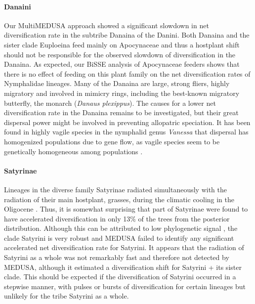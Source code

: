 \documentclass[10pt,letterpaper]{article}
\begin{document}
\paragraph*{Danaini}
Our MultiMEDUSA approach showed a significant slowdown in net
diversification rate in the subtribe Danaina of the Danini. Both Danaina
and the sister clade Euploeina feed mainly on Apocynaceae and thus a
hostplant shift should not be responsible for the observed slowdown of
diversification in the Danaina. As expected, our BiSSE analysis of
Apocynaceae feeders shows that there is no effect of feeding on this
plant family on the net diversification rates of Nymphalidae lineages.
Many of the Danaina are large, strong fliers, highly migratory and
involved in mimicry rings, including the best-known migratory butterfly,
the monarch (\emph{Danaus plexippus}).
The causes for a lower net diversification rate in the
Danaina remains to be investigated, but their great dispersal power
might be involved in preventing allopatric speciation. It has been found
in highly vagile species in the nymphalid genus \emph{Vanessa} that
dispersal has homogenized populations due to gene flow, as 
vagile species seem to be genetically homogeneous among
populations \cite{wahlberg2011}.

\paragraph*{Satyrinae}

Lineages in the diverse family Satyrinae radiated simultaneously with
the radiation of their main hostplant, grasses, during the climatic
cooling in the Oligocene \cite{pena2008}. Thus, it is somewhat surprising that
part of Satyrinae were found to have accelerated diversification in only
13\% of the trees from the posterior distribution. Although this can be
attributed to low phylogenetic signal \cite{wahlberg2009}, the clade Satyrini is
very robust \cite{wahlberg2009} and MEDUSA failed to identify any significant
accelerated net diversification rate for Satyrini.
It appears that the
radiation of Satyrini as a whole was not remarkably fast and therefore
not detected by MEDUSA, although it estimated a diversification shift
for Satyrini + its sister clade. This should be expected if the
diversification of Satyrini occurred in a stepwise manner, with pulses
or bursts of diversification for certain lineages but unlikely for the
tribe Satyrini as a whole.
\end{document}
